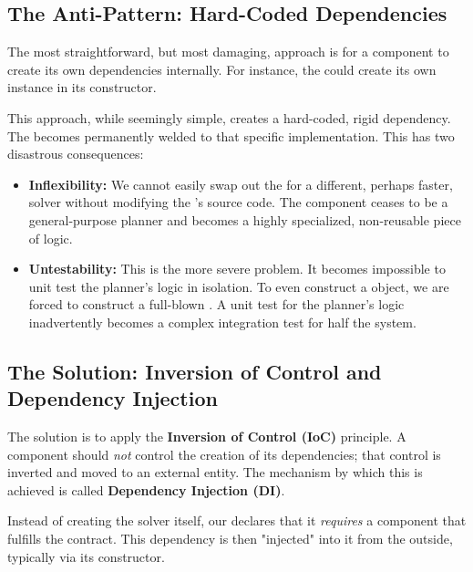 \subsection{The Anti-Pattern: Hard-Coded Dependencies}
\label{subsec:hard_coded_dependencies_conceptual}

The most straightforward, but most damaging, approach is for a component to create its own dependencies internally. For instance, the  could create its own  instance in its constructor.

This approach, while seemingly simple, creates a hard-coded, rigid dependency. The  becomes permanently welded to that specific implementation. This has two disastrous consequences:
\begin{itemize}
    \item \textbf{Inflexibility:} We cannot easily swap out the  for a different, perhaps faster, solver without modifying the 's source code. The component ceases to be a general-purpose planner and becomes a highly specialized, non-reusable piece of logic.
    \item \textbf{Untestability:} This is the more severe problem. It becomes impossible to unit test the planner's logic in isolation. To even construct a  object, we are forced to construct a full-blown . A unit test for the planner's logic inadvertently becomes a complex integration test for half the system.
\end{itemize}

\subsection{The Solution: Inversion of Control and Dependency Injection}
\label{subsec:inversion_of_control_conceptual}

The solution is to apply the \textbf{Inversion of Control (IoC)} principle. A component should \textit{not} control the creation of its dependencies; that control is inverted and moved to an external entity. The mechanism by which this is achieved is called \textbf{Dependency Injection (DI)}.

Instead of creating the solver itself, our  declares that it \textit{requires} a component that fulfills the  contract. This dependency is then "injected" into it from the outside, typically via its constructor.

